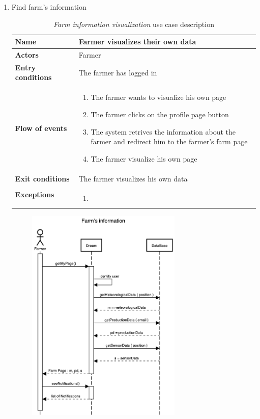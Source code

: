 \begin{enumerate}
    \item Find farm’s information
    \begin{longtable}{p{0.26\linewidth}p{0.75\linewidth}}
        \toprule
        \textbf{Name} & \textbf{Farmer visualizes their own data} \\
        \midrule
        \textbf{Actors} & Farmer \\
        \midrule
        \textbf{Entry conditions} & The farmer has logged in\\
        \midrule
        \textbf{Flow of events} & 
        \begin{enumerate}
            \item The farmer wants to visualize his own page
            \item The farmer clicks on the profile page button
            \item The system retrives the information about the farmer and redirect him to the farmer's farm page
            \item The farmer visualize his own page
        \end{enumerate} \\
        \midrule
        \textbf{Exit conditions} & The farmer visualizes his own data\\
        \midrule
        \textbf{Exceptions} & 
        \begin{enumerate}
            \item
        \end{enumerate}\\
        \bottomrule
        \caption{\emph{Farm information visualization} use case description}
    \end{longtable}
    \begin{figure}[H]
        \begin{center}
        \includegraphics[width=0.7\textwidth]{sequence/FarmInformation.png}

\end{center}
\end{figure}
\end{enumerate}
